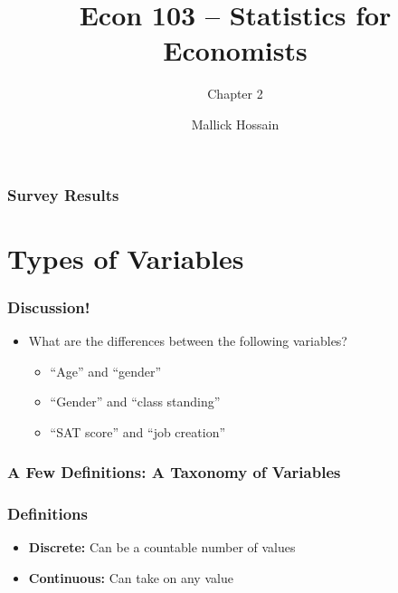 \documentclass[handout]{beamer}
\title{Econ 103 -- Statistics for Economists}
\subtitle{Chapter 2}
\author{Mallick Hossain}
\date{}
\institute{University of Pennsylvania}
\begin{document}
\begin{frame}
	\titlepage 
\end{frame} 

\begin{frame}
\frametitle{Survey Results}
\end{frame} 

\section{Types of Variables}
\begin{frame}
\frametitle{Discussion!}
	\begin{itemize}
		\item What are the differences between the following variables?
		\begin{itemize}
			\item ``Age'' and ``gender''
			\item ``Gender'' and ``class standing''
			\item ``SAT score'' and ``job creation''
		\end{itemize}
	\end{itemize}
\end{frame} 

\begin{frame}
\frametitle{A Few Definitions: A Taxonomy of Variables}
	\begin{figure}[htbp]
	\begin{center}
		\end{center}
	\end{figure}
\end{frame}

\begin{frame}
\frametitle{Definitions}
	\begin{itemize}
		\item \textbf{Discrete:} Can be a countable number of values
		\item \textbf{Continuous:} Can take on any value
	\end{itemize}
\end{frame}
\end{document}
